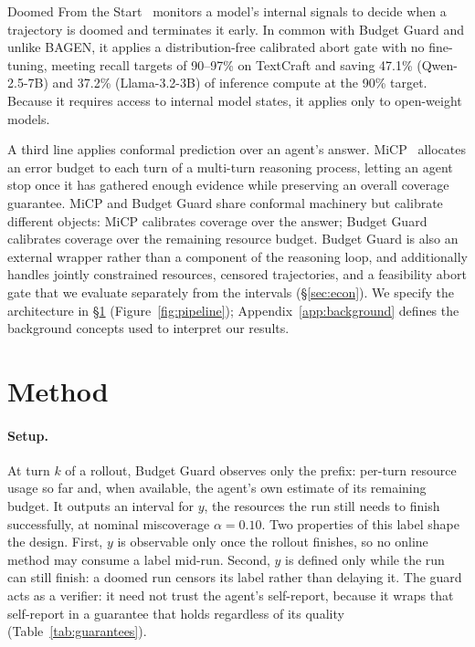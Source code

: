 \documentclass{article}
\begin{document}
Doomed From the Start~\cite{ruan2026doomed} monitors a model's internal signals to decide when a trajectory is doomed and terminates it early. In common with Budget Guard and unlike BAGEN, it applies a distribution-free calibrated abort gate with no fine-tuning, meeting recall targets of 90--97\% on TextCraft and saving 47.1\% (Qwen-2.5-7B) and 37.2\% (Llama-3.2-3B) of inference compute at the 90\% target. Because it requires access to internal model states, it applies only to open-weight models.

A third line applies conformal prediction over an agent's answer. MiCP~\cite{zhou2026adaptive} allocates an error budget to each turn of a multi-turn reasoning process, letting an agent stop once it has gathered enough evidence while preserving an overall coverage guarantee. MiCP and Budget Guard share conformal machinery but calibrate different objects: MiCP calibrates coverage over the answer; Budget Guard calibrates coverage over the remaining resource budget. Budget Guard is also an external wrapper rather than a component of the reasoning loop, and additionally handles jointly constrained resources, censored trajectories, and a feasibility abort gate that we evaluate separately from the intervals (\S\ref{sec:econ}). We specify the architecture in \S\ref{sec:method} (Figure~\ref{fig:pipeline}); Appendix~\ref{app:background} defines the background concepts used to interpret our results.

\FloatBarrier
\section{Method}
\label{sec:method}

\paragraph{Setup.}
At turn $k$ of a rollout, Budget Guard observes only the prefix: per-turn resource usage so far and, when available, the agent's own estimate of its remaining budget. It outputs an interval for $y$, the resources the run still needs to finish successfully, at nominal miscoverage $\alpha{=}0.10$. Two properties of this label shape the design. First, $y$ is observable only once the rollout finishes, so no online method may consume a label mid-run. Second, $y$ is defined only while the run can still finish: a doomed run censors its label rather than delaying it. The guard acts as a verifier: it need not trust the agent's self-report, because it wraps that self-report in a guarantee that holds regardless of its quality (Table~\ref{tab:guarantees}).
\end{document}
